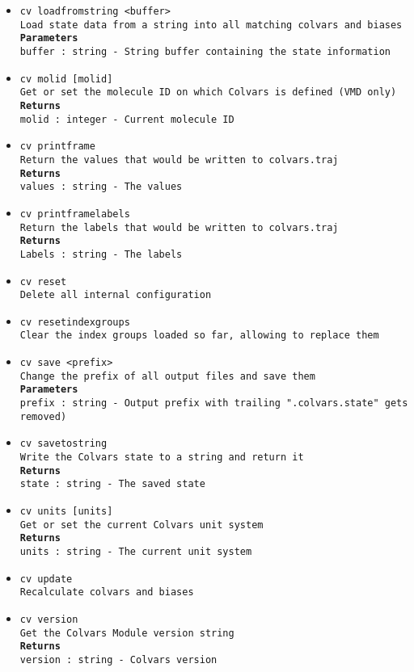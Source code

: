 \begin{itemize}
\item \texttt{cv loadfromstring <buffer>}
\\
\texttt{Load state data from a string into all matching colvars and biases}
\\
\texttt{\textbf{Parameters}}
\\
\texttt{buffer : string - String buffer containing the state information}
\item \texttt{cv molid [molid]}
\\
\texttt{Get or set the molecule ID on which Colvars is defined (VMD only)}
\\
\texttt{\textbf{Returns}}
\\
\texttt{molid : integer - Current molecule ID}
\item \texttt{cv printframe}
\\
\texttt{Return the values that would be written to colvars.traj}
\\
\texttt{\textbf{Returns}}
\\
\texttt{values : string - The values}
\item \texttt{cv printframelabels}
\\
\texttt{Return the labels that would be written to colvars.traj}
\\
\texttt{\textbf{Returns}}
\\
\texttt{Labels : string - The labels}
\item \texttt{cv reset}
\\
\texttt{Delete all internal configuration}
\item \texttt{cv resetindexgroups}
\\
\texttt{Clear the index groups loaded so far, allowing to replace them}
\item \texttt{cv save <prefix>}
\\
\texttt{Change the prefix of all output files and save them}
\\
\texttt{\textbf{Parameters}}
\\
\texttt{prefix : string - Output prefix with trailing ".colvars.state" gets removed)}
\item \texttt{cv savetostring}
\\
\texttt{Write the Colvars state to a string and return it}
\\
\texttt{\textbf{Returns}}
\\
\texttt{state : string - The saved state}
\item \texttt{cv units [units]}
\\
\texttt{Get or set the current Colvars unit system}
\\
\texttt{\textbf{Returns}}
\\
\texttt{units : string - The current unit system}
\item \texttt{cv update}
\\
\texttt{Recalculate colvars and biases}
\item \texttt{cv version}
\\
\texttt{Get the Colvars Module version string}
\\
\texttt{\textbf{Returns}}
\\
\texttt{version : string - Colvars version}
\end{itemize}
